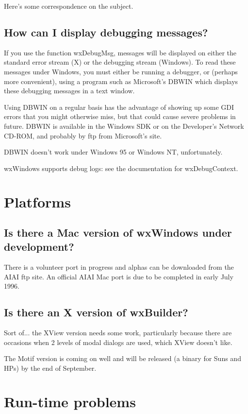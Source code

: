 Here's some correspondence on the subject.


%
\section{How can I display debugging messages?}

If you use the function wxDebugMsg, messages will be displayed on either
the standard error stream (X) or the debugging stream (Windows). To read
these messages under Windows, you must either be running a debugger,
or (perhaps more convenient), using a program such as Microsoft's DBWIN
which displays these debugging messages in a text window.

Using DBWIN on a regular basis has the advantage of showing up some GDI
errors that you might otherwise miss, but that could cause severe
problems in future. DBWIN is available in the Windows SDK or
on the Developer's Network CD-ROM, and probably by ftp from Microsoft's
site.

DBWIN doesn't work under Windows 95 or Windows NT, unfortunately.

wxWindows supports debug logs: see the documentation for wxDebugContext.

\chapter{Platforms}

\section{Is there a Mac version of wxWindows under development?}

There is a volunteer port in progress and alphas can be downloaded from the
AIAI ftp site. An official AIAI Mac port is due to be completed in early July 1996.

\section{Is there an X version of wxBuilder?}

Sort of... the XView version needs some work, particularly because there
are occasions when 2 levels of modal dialogs are used, which XView doesn't
like.

The Motif version is coming on well and will be released (a binary for Suns and HPs)
by the end of September.

\chapter{Run-time problems}

